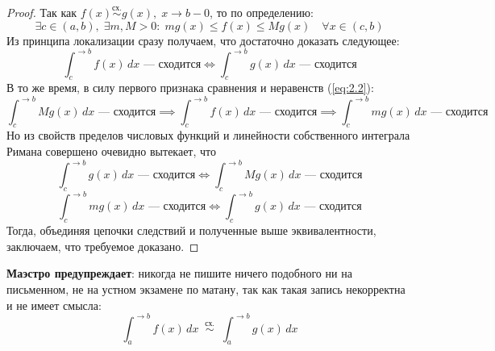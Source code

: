 \documentclass[11pt]{article}
\begin{document}
\begin{proof}
    Так как $f(x) \overset{\text{сх.}}{\sim} g(x), \; x \to b - 0$, то по определению:
    \begin{equation*} \label{eq:2.2} \tag{$\vee$}
        \exists c \in (a, b),\; \exists m, M > 0: \; m g(x) \leq f(x) \leq M g(x) \quad \forall x \in (c, b)
    \end{equation*}
    Из принципа локализации сразу получаем, что достаточно доказать следующее:
    \[\int_{c}^{\to b} f(x) \, dx \text{ --- сходится} \iff \int_{c}^{\to b} g(x) \, dx \text{ --- сходится}\]
    В то же время, в силу первого признака сравнения и неравенств (\ref{eq:2.2}):
    \[\int_{c}^{\to b} M g(x) \, dx  \text{ --- сходится} \implies \int_{c}^{\to b} f(x) \, dx \text{ --- сходится} \implies \int_{c}^{\to b} m g(x) \, dx  \text{ --- сходится}\]
    Но из свойств пределов числовых функций и линейности собственного интеграла Римана совершено очевидно вытекает, что
    \[\int_{c}^{\to b} g(x) \, dx  \text{ --- сходится} \iff \int_{c}^{\to b} M g(x) \, dx  \text{ --- сходится}\]
    \[\int_{c}^{\to b} m g(x) \, dx  \text{ --- сходится} \iff \int_{c}^{\to b} g(x) \, dx  \text{ --- сходится}\]
    Тогда, объединяя цепочки следствий и полученные выше эквивалентности, заключаем, что требуемое доказано.
\end{proof}

\begin{remark}
    \textbf{Маэстро предупреждает}: никогда не пишите ничего подобного ни на письменном, не на устном экзамене по матану, так как такая запись некорректна и не имеет смысла:
    \[\int_{a}^{\to b} f(x) \, dx  \; \; \overset{\text{сх.}}{\sim} \; \; \int_{a}^{\to b} g(x) \, dx\]
\end{remark}
\end{document}
